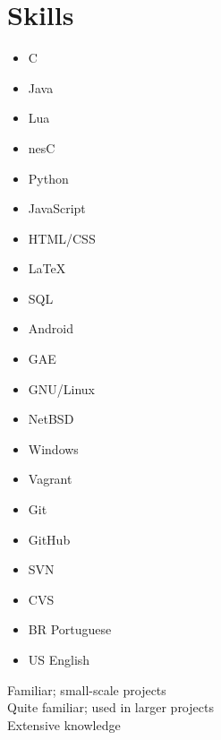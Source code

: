 \documentclass[a4paper,10pt]{article}
\begin{document}
\section{Skills}

\begin{multicols}{3}
  \begin{itemize}
    \renewcommand{\labelitemi}{\textcolor{lightg}{\symbol{"00BB}}}
    \setlength{\itemsep}{1pt}
    \setlength{\parskip}{0pt}
    \setlength{\parsep}{0pt}
  \item C \hfill \threenotes 
  \item Java \hfill \threenotes
  \item Lua \hfill \threenotes
  \item nesC \hfill \onenote
  \item Python \hfill \twonotes
  \item JavaScript \hfill \twonotes
  \item HTML/CSS \hfill \twonotes
  \item \LaTeX \hfill \onenote
  \item SQL \hfill \twonotes
  \item Android \hfill \twonotes
  \item GAE \hfill \twonotes
  \item GNU/Linux \hfill \threenotes
  \item NetBSD \hfill \twonotes
  \item Windows \hfill \onenote
  \item Vagrant \hfill \twonotes
  \item Git \hfill \twonotes
  \item GitHub \hfill \twonotes
  \item SVN \hfill \onenote
  \item CVS \hfill \onenote
  \item BR Portuguese \hfill \twonotes
  \item US English \hfill \twonotes
  \end{itemize} 
\end{multicols}

\vspace{1em}

\begin{center}
\parbox[c]{8cm}{
  \onenote Familiar; small-scale projects \\
  \twonotes Quite familiar; used in larger projects \\
  \threenotes Extensive knowledge
}
\end{center}
\end{document}
